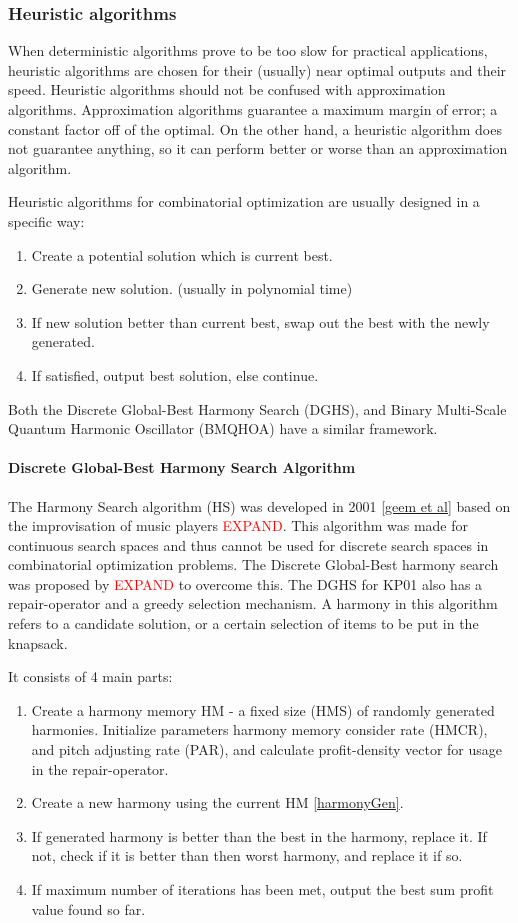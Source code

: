 \documentclass[titlepage]{article}
\begin{document}
\subsubsection*{Heuristic algorithms}
When deterministic algorithms prove to be too slow for practical applications, heuristic algorithms are chosen for their (usually) near optimal outputs and their speed. Heuristic algorithms should not be confused with approximation algorithms. Approximation algorithms guarantee a maximum margin of error; a constant factor off of the optimal. On the other hand, a heuristic algorithm does not guarantee anything, so it can perform better or worse than an approximation algorithm. 

Heuristic algorithms for combinatorial optimization are usually designed in a specific way:
\begin{enumerate}
    \item Create a potential solution which is current best.
    \item Generate new solution. (usually in polynomial time) 
    \item If new solution better than current best, swap out the best with the newly generated. 
    \item If satisfied, output best solution, else continue.
\end{enumerate}

Both the Discrete Global-Best Harmony Search (DGHS), and Binary Multi-Scale Quantum Harmonic Oscillator (BMQHOA) have a similar framework.

\paragraph*{Discrete Global-Best Harmony Search Algorithm}
The Harmony Search algorithm (HS) was developed in 2001 \ref{geem et al} based on the improvisation of music players \textcolor{red}{EXPAND}. This algorithm was made for continuous search spaces and thus cannot be used for discrete search spaces in combinatorial optimization problems. The Discrete Global-Best harmony search was proposed by \textcolor{red}{EXPAND} to overcome this. The DGHS for KP01 also has a repair-operator and a greedy selection mechanism. A harmony in this algorithm refers to a candidate solution, or a certain selection of items to be put in the knapsack. 

It consists of 4 main parts:
\begin{enumerate}
    \item Create a harmony memory HM - a fixed size (HMS) of randomly generated harmonies. Initialize parameters harmony memory consider rate (HMCR), and pitch adjusting rate (PAR), and calculate profit-density vector for usage in the repair-operator.
    \item Create a new harmony using the current HM \ref{harmonyGen}.
    \item If generated harmony is better than the best in the harmony, replace it. If not, check if it is better than then worst harmony, and replace it if so. 
    \item If maximum number of iterations has been met, output the best sum profit value found so far.
\end{enumerate}
\end{document}
